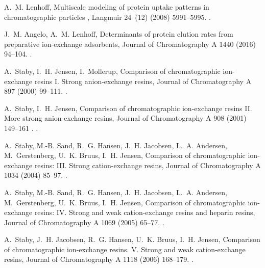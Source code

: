 \documentclass[preprint,review,12pt]{elsarticle}
\providecommand{\DIFaddtex}[1]{{\protect\color{blue} \sf #1}} %
\providecommand{\DIFaddbegin}{} %
\providecommand{\DIFaddend}{} %
\providecommand{\DIFadd}[1]{\texorpdfstring{\DIFaddtex{#1}}{#1}} %
\begin{document}
\begin{thebibliography}{10}
\DIFadd{A.~M. Lenhoff, }{\DIFadd{Multiscale modeling of protein uptake patterns in
  chromatographic particles}}\DIFadd{, Langmuir 24~(12) (2008) 5991--5995.
}\newblock \href {https://doi.org/10.1021/la8004163}
  {}\DIFadd{.
}

\DIFaddend {}
J.~M. Angelo, A.~M. Lenhoff, {Determinants of protein elution rates from
  preparative ion-exchange adsorbents}, Journal of Chromatography A 1440 (2016)
  94--104.
\newblock \href {https://doi.org/10.1016/j.chroma.2016.02.048}
  {}.

A.~Staby, I.~H. Jensen, I.~Mollerup, {Comparison of chromatographic
  ion-exchange resins I. Strong anion-exchange resins}, Journal of
  Chromatography A 897 (2000) 99--111.
\newblock \href {https://doi.org/10.1016/s0021-9673(00)00780-9}
  {}.

A.~Staby, I.~H. Jensen, {Comparison of chromatographic ion-exchange resins II.
  More strong anion-exchange resins}, Journal of Chromatography A 908 (2001)
  149--161\DIFaddbegin \DIFadd{.
}\newblock \href {https://doi.org/10.1016/S0021-9673(00)00999-7}
  {}\DIFaddend .

A.~Staby, M.-B. Sand, R.~G. Hansen, J.~H. Jacobsen, L.~A. Andersen,
  M.~Gerstenberg, U.~K. Bruus, I.~H. Jensen, {Comparison of chromatographic
  ion-exchange resins: III. Strong cation-exchange resins}, Journal of
  Chromatography A 1034 (2004) 85--97.
\newblock \href {https://doi.org/10.1016/j.chroma.2004.01.026}
  {}.

A.~Staby, M.-B. Sand, R.~G. Hansen, J.~H. Jacobsen, L.~A. Andersen,
  M.~Gerstenberg, U.~K. Bruus, I.~H. Jensen, {Comparison of chromatographic
  ion-exchange resins: IV. Strong and weak cation-exchange resins and heparin
  resins}, Journal of Chromatography A 1069 (2005) 65--77.
\newblock \href {https://doi.org/10.1016/j.chroma.2004.11.094}
  {}.

A.~Staby, J.~H. Jacobsen, R.~G. Hansen, U.~K. Bruus, I.~H. Jensen, {Comparison
  of chromatographic ion-exchange resins. V. Strong and weak cation-exchange
  resins}, Journal of Chromatography A 1118 (2006) 168--179.
\newblock \href {https://doi.org/10.1016/j.chroma.2006.03.116}
  {}.


\end{thebibliography}
\end{document}
